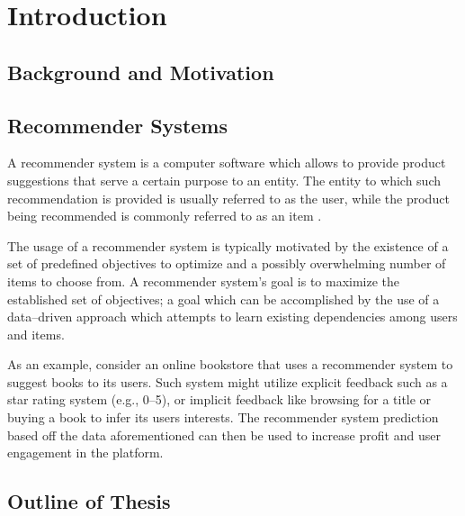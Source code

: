 \section{Introduction} \label{sect:intro}

\subsection{Background and Motivation} \label{subsect:intro:background}

\subsection{Recommender Systems} \label{subsect:intro:recommender-systems}

A recommender system is a computer software which allows to provide product suggestions that serve a certain purpose to an entity. The entity to which such recommendation is provided is usually referred to as the user, while the product being recommended is commonly referred to as an item \cite{book:rs}.

The usage of a recommender system is typically motivated by the existence of a set of predefined objectives to optimize and a possibly overwhelming number of items to choose from. A recommender system's goal is to maximize the established set of objectives; a goal which can be accomplished by the use of a data--driven approach which attempts to learn existing dependencies among users and items.

As an example, consider an online bookstore that uses a recommender system to suggest books to its users. Such system might utilize explicit feedback such as a star rating system (e.g., 0--5), or implicit feedback like browsing for a title or buying a book to infer its users interests. The recommender system prediction based off the data aforementioned can then be used to increase profit and user engagement in the platform.

\subsection{Outline of Thesis} \label{subsect:intro:outline}
